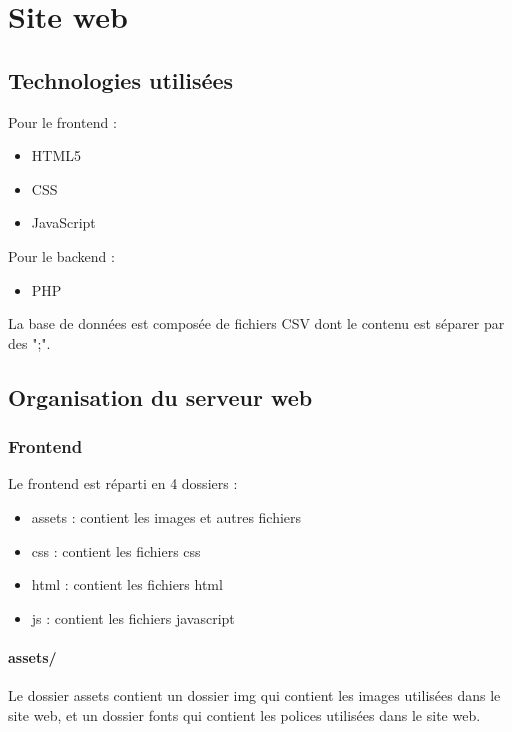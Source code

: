 \documentclass[12pt, openany]{article}
\begin{document}
	\section{Site web}
	\subsection{Technologies utilisées}
	Pour le frontend :
	\begin{itemize}[label=$-$]
		\item HTML5\\
		\item CSS\\
		\item JavaScript\\
	\end{itemize}
	Pour le backend :
	\begin{itemize}[label=$-$]
		\item PHP\\
	\end{itemize}
	La base de données est composée de fichiers CSV dont le contenu est séparer par des ";".\\

	\subsection{Organisation du serveur web}
	\subsubsection{Frontend}
	Le frontend est réparti en 4 dossiers :
	\begin{itemize}[label=$-$]
		\item assets : contient les images et autres fichiers\\
		\item css : contient les fichiers css\\
		\item html : contient les fichiers html\\
		\item js : contient les fichiers javascript\\
	\end{itemize}

	\paragraph{assets/}
	Le dossier assets contient un dossier img qui contient les images utilisées dans le site web, et un dossier fonts qui contient les polices utilisées dans le site web.
\end{document}
